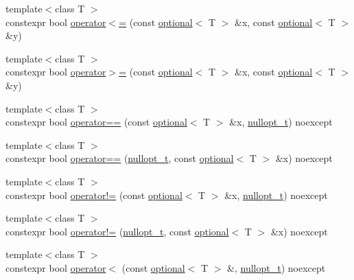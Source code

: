 \begin{DoxyCompactItemize}
\item 
{\footnotesize template$<$class T $>$ }\\constexpr bool \hyperlink{namespacestd_1_1experimental_afd5e1ebb8edd29dc3916bf546c9ffca3}{operator$<$=} (const \hyperlink{classstd_1_1experimental_1_1optional}{optional}$<$ T $>$ \&x, const \hyperlink{classstd_1_1experimental_1_1optional}{optional}$<$ T $>$ \&y)
\item 
{\footnotesize template$<$class T $>$ }\\constexpr bool \hyperlink{namespacestd_1_1experimental_a2c2515ef0e94b6089f60aaf6757741c9}{operator$>$=} (const \hyperlink{classstd_1_1experimental_1_1optional}{optional}$<$ T $>$ \&x, const \hyperlink{classstd_1_1experimental_1_1optional}{optional}$<$ T $>$ \&y)
\item 
{\footnotesize template$<$class T $>$ }\\constexpr bool \hyperlink{namespacestd_1_1experimental_a4f15144833bc5951b01fbd4b4bfdb6fb}{operator==} (const \hyperlink{classstd_1_1experimental_1_1optional}{optional}$<$ T $>$ \&x, \hyperlink{structstd_1_1experimental_1_1nullopt__t}{nullopt\+\_\+t}) noexcept
\item 
{\footnotesize template$<$class T $>$ }\\constexpr bool \hyperlink{namespacestd_1_1experimental_a23a59ad403fb2809087806ff9037d42e}{operator==} (\hyperlink{structstd_1_1experimental_1_1nullopt__t}{nullopt\+\_\+t}, const \hyperlink{classstd_1_1experimental_1_1optional}{optional}$<$ T $>$ \&x) noexcept
\item 
{\footnotesize template$<$class T $>$ }\\constexpr bool \hyperlink{namespacestd_1_1experimental_a768f39fe88fcf07a351e8f45d6dfb1b3}{operator!=} (const \hyperlink{classstd_1_1experimental_1_1optional}{optional}$<$ T $>$ \&x, \hyperlink{structstd_1_1experimental_1_1nullopt__t}{nullopt\+\_\+t}) noexcept
\item 
{\footnotesize template$<$class T $>$ }\\constexpr bool \hyperlink{namespacestd_1_1experimental_aa340c9c2a57fd083695e470ded11c089}{operator!=} (\hyperlink{structstd_1_1experimental_1_1nullopt__t}{nullopt\+\_\+t}, const \hyperlink{classstd_1_1experimental_1_1optional}{optional}$<$ T $>$ \&x) noexcept
\item 
{\footnotesize template$<$class T $>$ }\\constexpr bool \hyperlink{namespacestd_1_1experimental_aa7075b9ff2db35978c50e744de295b37}{operator$<$} (const \hyperlink{classstd_1_1experimental_1_1optional}{optional}$<$ T $>$ \&, \hyperlink{structstd_1_1experimental_1_1nullopt__t}{nullopt\+\_\+t}) noexcept

\end{DoxyCompactItemize}
